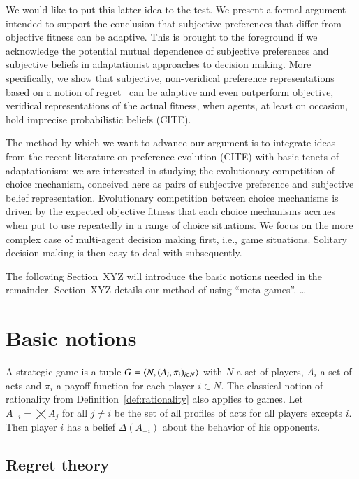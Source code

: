 \documentclass[fleqn,reqno,11pt]{article}
\begin{document}
We would like to put this latter idea to the test. We present a formal argument intended to
support the conclusion that subjective preferences that differ from objective fitness can be
adaptive. This is brought to the foreground if we acknowledge the potential mutual dependence
of subjective preferences and subjective beliefs in adaptationist approaches to decision
making. More specifically, we show that subjective, non-veridical preference representations
based on a notion of regret
\citep[e.g.][]{Savage1951:The-theory-of-s,LoomesSugden1982:Regret-Theory:-}\ can be adaptive and even outperform objective, veridical representations of the
actual fitness, when agents, at least on occasion, hold imprecise probabilistic beliefs
(CITE). 

The method by which we want to advance our argument is to integrate ideas from the recent
literature on preference evolution (CITE) with basic tenets of adaptationism: we are interested
in studying the evolutionary competition of choice mechanism, conceived here as pairs of
subjective preference and subjective belief representation. Evolutionary competition between
choice mechanisms is driven by the expected objective fitness that each choice mechanisms
accrues when put to use repeatedly in a range of choice situations. We focus on the more
complex case of multi-agent decision making first, i.e., game situations. Solitary decision
making is then easy to deal with subsequently.

The following Section~XYZ will introduce the basic notions needed in the remainder. Section~XYZ
details our method of using ``meta-games''. \dots


\section{Basic notions}
\label{sec:basic-notions}

A strategic game is a tuple $ G=\left \langle  N, (A_i , \pi_i)_{i \in N} \right\rangle$ with $N$ a set of
players, $A_i$ a set of acts and $\pi_i$ a payoff function for each player $i \in N$. The
classical notion of rationality from Definition~\ref{def:rationality} also applies to
games. Let $A_{-i} = \bigtimes A_j$ for all $j \neq i$ be the set of all profiles of acts for
all players excepts $i$. Then player $i$ has a belief $\Delta(A_{-i})$ about the behavior of
his opponents. 

\subsection{Regret theory} \label{sec:regreTheory}
\end{document}

